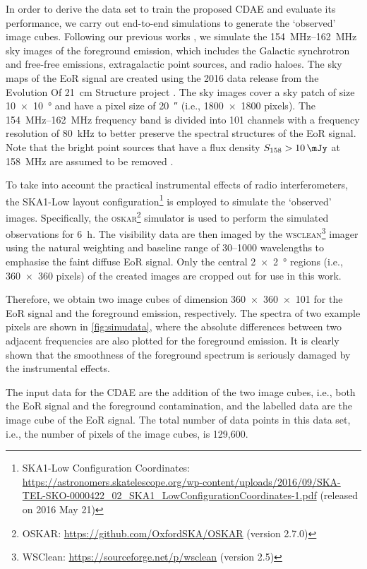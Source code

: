 \documentclass[letters,a4paper,fleqn,usenatbib]{mnras}
\begin{document}
In order to derive the data set to train the proposed CDAE and evaluate
its performance, we carry out end-to-end simulations to generate the
`observed' image cubes.
Following our previous works \citep{wang2010,wang2013}, we simulate the
\SIrange{154}{162}{\MHz} sky images of the foreground emission,
which includes the Galactic synchrotron and free-free emissions,
extragalactic point sources, and radio haloes.
The sky maps of the EoR signal are created using the 2016 data release
from the Evolution Of 21~cm Structure project \citep{mesinger2016}.
The sky images cover a sky patch of size \SI{10 x 10}{\degree} and have
a pixel size of \SI{20}{\arcsecond} (i.e., \num{1800 x 1800} pixels).
The \SIrange{154}{162}{\MHz} frequency band is divided into 101
channels with a frequency resolution of \SI{80}{\kHz} to better
preserve the spectral structures of the EoR signal.
Note that the bright point sources that have a flux density
$S_{158} > \SI{10}{\mJy}$ at \SI{158}{\MHz} are assumed to be
removed \citep[e.g.,][]{liu2009ps}.

To take into account the practical instrumental effects of radio
interferometers, the SKA1-Low layout configuration\footnote{%
  SKA1-Low Configuration Coordinates:
  \url{https://astronomers.skatelescope.org/wp-content/uploads/2016/09/SKA-TEL-SKO-0000422_02_SKA1_LowConfigurationCoordinates-1.pdf}
  (released on 2016 May 21)}
is employed to simulate the `observed' images.
Specifically, the \textsc{oskar}\footnote{%
  OSKAR: \url{https://github.com/OxfordSKA/OSKAR} (version 2.7.0)}
simulator \citep{mort2010} is used to perform the simulated
observations for \SI{6}{\hour}.
The visibility data are then imaged by the \textsc{wsclean}\footnote{%
  WSClean: \url{https://sourceforge.net/p/wsclean} (version 2.5)}
imager \citep{offringa2014} using the natural weighting and baseline
range of \numrange{30}{1000} wavelengths to emphasise the faint diffuse
EoR signal.
Only the central \SI{2 x 2}{\degree} regions (i.e., \num{360 x 360}
pixels) of the created images are cropped out for use in this work.

Therefore, we obtain two image cubes of dimension \num{360 x 360 x 101}
for the EoR signal and the foreground emission, respectively.
The spectra of two example pixels are shown in \autoref{fig:simudata},
where the absolute differences between two adjacent frequencies are
also plotted for the foreground emission.
It is clearly shown that the smoothness of the foreground spectrum is
seriously damaged by the instrumental effects.

The input data for the CDAE are the addition of the two image cubes,
i.e., both the EoR signal and the foreground contamination,
and the labelled data are the image cube of the EoR signal.
The total number of data points in this data set, i.e., the number of
pixels of the image cubes, is 129,600.
\end{document}
